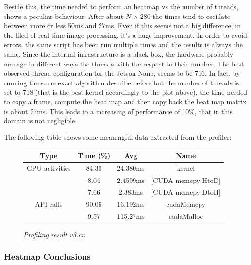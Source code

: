 \documentclass[paper=a4, fontsize=10pt]{scrartcl}	%
\begin{document}
	Beside this, the time needed to perform an heatmap vs the number of threads, shows a peculiar behaviour. After about $N > 280$ the times tend to oscillate between more or less 50ms and 27ms. Even if this seems not a big difference, in the filed of real-time image processing, it's a huge improvement. In order to avoid errors, the same script has been run multiple times and the results is always the same. Since the internal infrastructure is a black box, the hardware probably manage in different ways the threads with the respect to their number.\newline
	The best observed thread configuration for the Jetson Nano, seems to be 716.\newline\newline
	In fact, by running the same exact algorithm describe before but the number of threads is set to 718 (that is the best kernel accordingly to the plot above), the time needed to copy a frame, compute the heat map and then copy back the heat map matrix is about 27ms. This leads to a increasing of performance of 10\%, that in this domain is not negligible.
	
	The following table shows some meaningful data extracted from the profiler:
		\begin{figure}[H]
		\centering
		\begin{center}
			\begin{tabular}{ |c|c|c|c| } 
				\hline
				\textbf{Type} & \textbf{Time} (\%) & \textbf{Avg} & \textbf{Name} \\ 
				\hline
				GPU activities & 84.30 & 24.380ms & kernel \\ 
				& 8.04 & 2.4599ms & [CUDA memcpy HtoD] \\ 
				& 7.66 & 2.383ms & [CUDA memcpy DtoH] \\ 
				\hline
				API calls & 90.06 & 16.192ms & cudaMemcpy \\ 
				& 9.57 & 115.27ms & cudaMalloc \\ 
				\hline
			\end{tabular}
		\end{center}
		\label{fig:table_v4}
		\caption{\textit{Profiling result v3.cu}}
	\end{figure}

	\subsubsection{Heatmap Conclusions}
\end{document}
